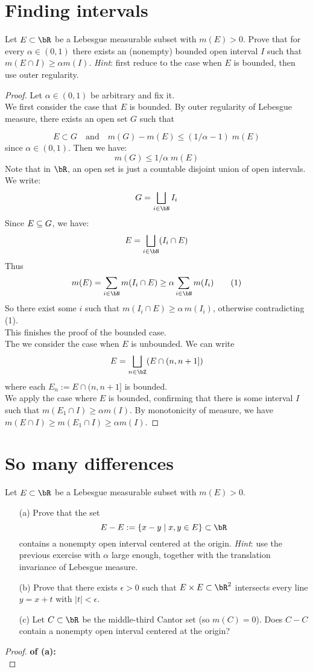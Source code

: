 \documentclass[lang=cn,11pt]{elegantbook}
\begin{document}
\section{Finding intervals}
  Let $E\subset\bR$ be a Lebesgue measurable subset with $m(E)>0$. Prove that for every $\alpha\in(0,1)$ there exists an (nonempty) bounded open interval $I$ such that $m(E\cap I)\ge\alpha m(I)$.
  \textit{Hint}: first reduce to the case when $E$ is bounded, then use outer regularity.
\begin{proof}
Let $\alpha \in (0,1)$ be arbitrary and fix it.\\
We first consider the case that $E$ is bounded. By outer regularity of Lebesgue measure, there exists an open set \( G \) such that

\[
E \subset G \quad \text{and} \quad m(G) - m(E) \leq  (1/\alpha-1) \; m(E)
\]
since $\alpha \in (0,1)$.
Then we have:
$$
m(G) \leq  1 / \alpha \; m(E)
$$
Note that in $\bR$, an open set is just a countable disjoint union of open intervals. We write:
$$
G = \bigsqcup_{i\in \bN} I_i
$$
Since $E \subseteq G$, we have:
$$
E = \bigsqcup_{i\in \bN}  (I_i \cap E)
$$
Thus 
$$
m(E) = \sum_{i\in \bN}  m(I_i \cap E) \geq \alpha \sum_{i\in \bN} m(I_i)
\tag{1}
$$
So there exist some $i$ such that $m(I_i \cap E) \geq \alpha \, m(I_i)$, otherwise contradicting (1).\\
This finishes the proof of the bounded case.\\
The we consider the case when $E$ is unbounded. 
We can write
\[
E = \bigsqcup_{n\in \bZ} (E \cap (n, n+1]) 
\]
where each $E_n :=E \cap (n, n+1]$ is bounded.\\
We apply the case where $E$ is bounded, confirming that there is some interval $I$ such that $m(E_1\cap I)\ge\alpha m(I)$. By monotonicity of measure, we have $m(E \cap I) \geq m(E_1 \cap I) \geq \alpha m(I)$.
\end{proof}




\section{So many differences}
  Let $E\subset\bR$ be a Lebesgue measurable subset with $m(E)>0$.
  \begin{itemize}
  \item[(a)]
    Prove that the set
    \[
      E-E:=\{x-y\mid x,y\in E\}\subset\bR
    \]
    contains a nonempty open interval centered at the
    origin. \textit{Hint}: use the previous exercise with $\alpha$
    large enough, together with the translation invariance of Lebesgue
    measure.
  \item[(b)]
    Prove that there exists $\epsilon>0$ such that $E\times E\subset\bR^2$ intersects every line $y=x+t$ with $|t|<\epsilon$.
  \item[(c)]
    Let $C\subset\bR$ be the middle-third Cantor set (so $m(C)=0$). Does $C-C$ contain a nonempty open interval centered at the origin?
  \end{itemize}  
\begin{proof}
\textbf{of (a): }\\

\end{proof}
\end{document}

